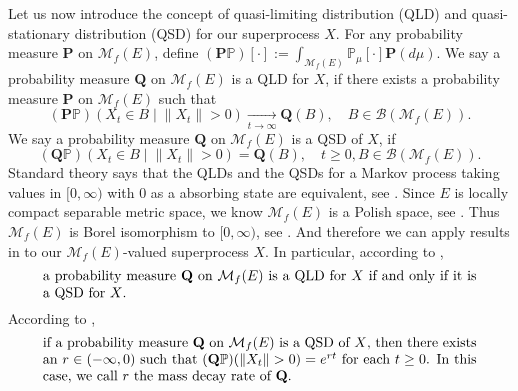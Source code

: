\documentclass[12pt,a4paper]{amsart}
\numberwithin{equation}{section}
\theoremstyle{plain}
\theoremstyle{definition}
\theoremstyle{remark}
\begin{document}
	Let us now introduce the concept of quasi-limiting distribution (QLD) and quasi-stationary distribution (QSD) for our superprocess $X$. 
	For any probability measure $\mathbf P$ on $\mathcal M_f(E)$, define $(\mathbf P\mathbb P)[\cdot] := \int_{\mathcal M_f(E)} \mathbb P_\mu[\cdot] \mathbf P(d\mu)$.
	We say a probability measure $\mathbf Q$ on $\mathcal M_f(E)$ is a QLD for $X$, if there exists a probability measure $\mathbf P$ on $\mathcal M_f(E)$ such that
	\[
	(\mathbf P\mathbb P)\left(X_t \in B \middle| \|X_t\|>0\right) \xrightarrow[t\to \infty]{} \mathbf Q(B), \quad B\in \mathcal B(\mathcal M_f(E)). 
	\]
	We say a probability measure $\mathbf Q$ on $\mathcal M_f(E)$ is a QSD of $X$, if 
	\[
	(\mathbf Q \mathbb P) \left( X_t \in B \middle | \|X_t\|>0 \right) = \mathbf Q(B), \quad t\geq 0, B \in \mathcal B(\mathcal M_f(E)).
	\]
	Standard theory says that the QLDs and the QSDs for a Markov process taking values in $[0,\infty)$ with $0$ as a absorbing state are equivalent, see \cite[Proposition 1]{MeleardVillemonais2012Quasi-stationary}. 
	Since $E$ is locally compact separable metric space, we know $\mathcal M_f(E)$ is a Polish space, see \cite[Lemma 4.3]{Kallenberg2017Random}.
	Thus $\mathcal M_f(E)$ is Borel isomorphism to $[0,\infty)$, see \cite[Theorem A.1.6]{Kallenberg2002Foundations}.
	And therefore we can apply results in \cite{MeleardVillemonais2012Quasi-stationary} to our $\mathcal M_f(E)$-valued superprocess $X$.
	In particular, according to \cite[Proposition 1]{MeleardVillemonais2012Quasi-stationary}, 
\begin{equation} \label{eq:S.1}
\begin{minipage}{0.9\textwidth}
		a probability measure $\mathbf Q$ on $\mathcal M_f(E)$ is a QLD for $X$ if and only if it is a QSD for $X$.
\end{minipage}
\end{equation}
	According to \cite[Proposition 2]{MeleardVillemonais2012Quasi-stationary}, 
\begin{equation} \label{eq:S.2}
\begin{minipage}{0.9\textwidth}
		if a probability measure $\mathbf Q$ on $\mathcal M_f(E)$ is a QSD of $X$, then there exists an $r\in (-\infty,0)$ such that $(\mathbf Q\mathbb P)(\|X_t\|>0) = e^{rt}$ for each $t\geq 0$.
		In this case, we call $r$ the mass decay rate of $\mathbf Q$.
\end{minipage}
\end{equation}
	
\end{document}
